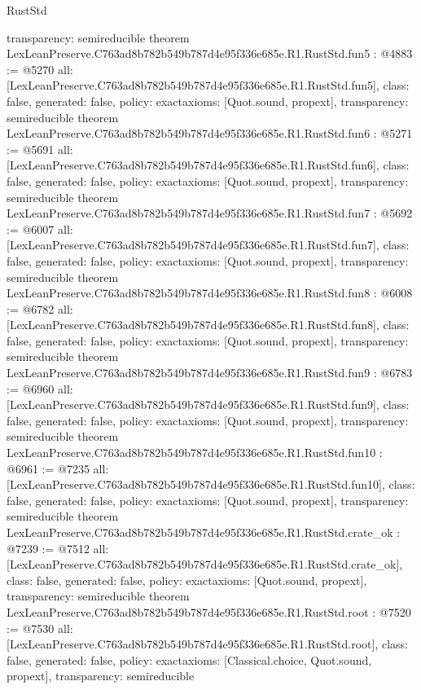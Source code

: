 \begin{lexlean}{RustStd}
\begin{coremodule}
{  transparency: semireducible
}
theorem LexLeanPreserve.C763ad8b782b549b787d4e95f336e685e.R1.RustStd.fun5 : @4883 := @5270 {
  all: [LexLeanPreserve.C763ad8b782b549b787d4e95f336e685e.R1.RustStd.fun5],
  class: false,
  generated: false,
  policy: exact{axioms: [Quot.sound, propext]},
  transparency: semireducible
}
theorem LexLeanPreserve.C763ad8b782b549b787d4e95f336e685e.R1.RustStd.fun6 : @5271 := @5691 {
  all: [LexLeanPreserve.C763ad8b782b549b787d4e95f336e685e.R1.RustStd.fun6],
  class: false,
  generated: false,
  policy: exact{axioms: [Quot.sound, propext]},
  transparency: semireducible
}
theorem LexLeanPreserve.C763ad8b782b549b787d4e95f336e685e.R1.RustStd.fun7 : @5692 := @6007 {
  all: [LexLeanPreserve.C763ad8b782b549b787d4e95f336e685e.R1.RustStd.fun7],
  class: false,
  generated: false,
  policy: exact{axioms: [Quot.sound, propext]},
  transparency: semireducible
}
theorem LexLeanPreserve.C763ad8b782b549b787d4e95f336e685e.R1.RustStd.fun8 : @6008 := @6782 {
  all: [LexLeanPreserve.C763ad8b782b549b787d4e95f336e685e.R1.RustStd.fun8],
  class: false,
  generated: false,
  policy: exact{axioms: [Quot.sound, propext]},
  transparency: semireducible
}
theorem LexLeanPreserve.C763ad8b782b549b787d4e95f336e685e.R1.RustStd.fun9 : @6783 := @6960 {
  all: [LexLeanPreserve.C763ad8b782b549b787d4e95f336e685e.R1.RustStd.fun9],
  class: false,
  generated: false,
  policy: exact{axioms: [Quot.sound, propext]},
  transparency: semireducible
}
theorem LexLeanPreserve.C763ad8b782b549b787d4e95f336e685e.R1.RustStd.fun10 : @6961 := @7235 {
  all: [LexLeanPreserve.C763ad8b782b549b787d4e95f336e685e.R1.RustStd.fun10],
  class: false,
  generated: false,
  policy: exact{axioms: [Quot.sound, propext]},
  transparency: semireducible
}
theorem LexLeanPreserve.C763ad8b782b549b787d4e95f336e685e.R1.RustStd.crate_ok : @7239 := @7512 {
  all: [LexLeanPreserve.C763ad8b782b549b787d4e95f336e685e.R1.RustStd.crate_ok],
  class: false,
  generated: false,
  policy: exact{axioms: [Quot.sound, propext]},
  transparency: semireducible
}
theorem LexLeanPreserve.C763ad8b782b549b787d4e95f336e685e.R1.RustStd.root : @7520 := @7530 {
  all: [LexLeanPreserve.C763ad8b782b549b787d4e95f336e685e.R1.RustStd.root],
  class: false,
  generated: false,
  policy: exact{axioms: [Classical.choice, Quot.sound, propext]},
  transparency: semireducible
}


\end{coremodule}
\end{lexlean}
